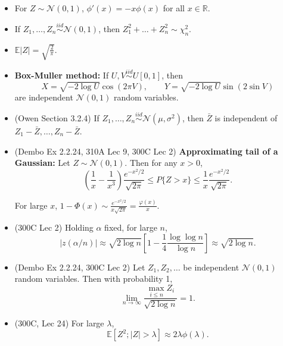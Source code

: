 \documentclass[twoside]{article}
\newcommand{\dis}{\displaystyle}
\newcommand\bbE{\mathbb{E}}
\newcommand\bbR{\mathbb{R}}
\newcommand\calN{\mathcal{N}}
\newcommand\lmb{\lambda}
\newcommand\sg{\sigma}
\newcommand\goesto{\rightarrow}
\begin{document}
\begin{itemize}
\item For $Z \sim \calN(0,1)$, $\phi'(x) = -x \phi(x)$ for all $x \in \bbR$.

\item If $Z_1, \dots, Z_n \stackrel{iid}{\sim} \calN(0,1)$, then $Z_1^2 + \dots + Z_n^2 \sim \chi_n^2$.

\item $\bbE |Z| = \sqrt{\dis\frac{2}{\pi}}$.

\item \textbf{Box-Muller method:} If $U, V \stackrel{iid}{\sim} U[0,1]$, then
\begin{equation*}
X = \sqrt{- 2 \log U} \cos (2 \pi V), \qquad Y = \sqrt{-2 \log U} \sin(2 \sin V)
\end{equation*}
are independent $\calN(0,1)$ random variables.

\item (Owen Section 3.2.4) If $Z_1, \dots, Z_n \stackrel{iid}{\sim} \calN(\mu, \sg^2)$, then $\bar{Z}$ is independent of $Z_1 - \bar{Z}, \dots, Z_n - \bar{Z}$.

\item (Dembo Ex 2.2.24, 310A Lec 9, 300C Lec 2) \textbf{Approximating tail of a Gaussian:} Let $Z \sim \calN(0,1)$. Then for any $x > 0$,
\begin{equation*}
\left( \frac{1}{x} - \frac{1}{x^3} \right) \frac{e^{-x^2/2}}{\sqrt{2\pi}} \leq P \{Z > x \} \leq \frac{1}{x} \frac{e^{-x^2/2}}{\sqrt{2\pi}}.
\end{equation*}

For large $x$, $1 - \Phi(x) \sim \displaystyle\frac{e^{-x^2/2}}{x\sqrt{2\pi}} = \displaystyle\frac{\varphi(x)}{x}$.

\item (300C Lec 2) Holding $\alpha$ fixed, for large $n$,
\begin{equation*}
|z(\alpha / n)| \approx \sqrt{2 \log n} \left[1 - \frac{1}{4} \frac{\log \log n}{\log n} \right] \approx \sqrt{2 \log n}.
\end{equation*}

\item (Dembo Ex 2.2.24, 300C Lec 2) Let $Z_1, Z_2, \dots$ be independent $\calN(0,1)$ random variables. Then with probability 1,
\begin{equation*}
\lim_{n \goesto \infty} \frac{\max_{i \leq n} Z_i}{\sqrt{2 \log n}} = 1.
\end{equation*}

\item (300C, Lec 24) For large $\lmb$, 
\begin{equation*}
\bbE [Z^2 ; |Z| > \lmb] \approx 2 \lmb \phi(\lmb).
\end{equation*}


\end{itemize}
\end{document}
